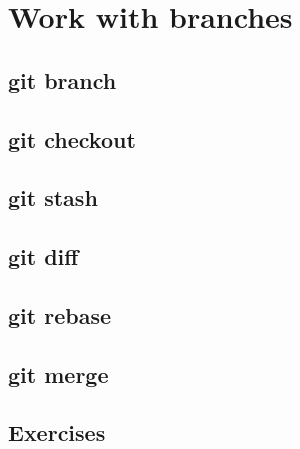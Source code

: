 \section{Work with branches}
\begin{frame}[fragile]
    \slidetitle
\end{frame}

\subsection{git branch}
\begin{frame}[fragile]
    \subslidetitle
\end{frame}

\subsection{git checkout}
\begin{frame}[fragile]
    \subslidetitle
\end{frame}

\subsection{git stash}
\begin{frame}[fragile]
    \subslidetitle
\end{frame}

\subsection{git diff}
\begin{frame}[fragile]
    \subslidetitle
\end{frame}

\subsection{git rebase}
\begin{frame}[fragile]
    \subslidetitle
\end{frame}

\subsection{git merge}
\begin{frame}[fragile]
    \subslidetitle
\end{frame}

\subsection{Exercises}
\begin{frame}[fragile]
  \subslidetitle
\end{frame}
